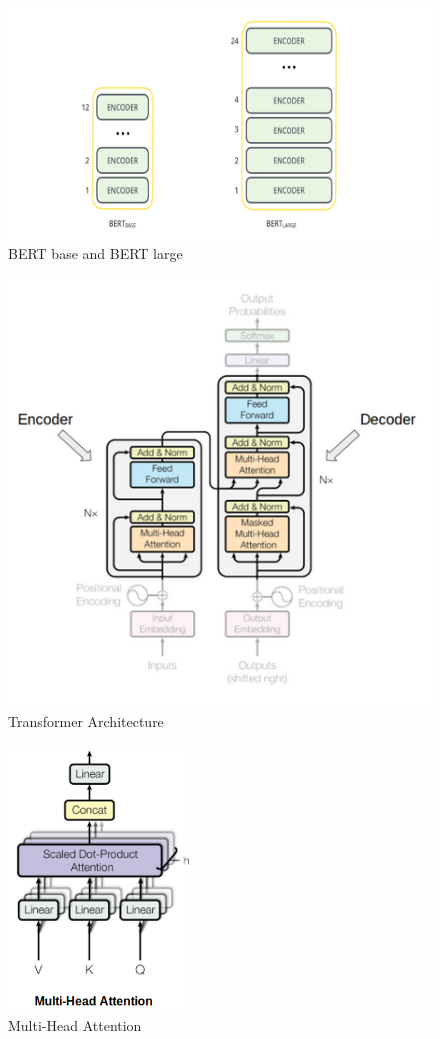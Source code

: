 \documentclass[11pt,a4paper]{article}
\begin{document}
\begin{figure}[!htb]
	\centering
	\includegraphics{figures/figure1.png}
	\caption{\label{fig:my-label} BERT base and BERT large \cite{BERT}}
\end{figure}

\begin{figure}[!htb]
	\centering
	\includegraphics{figures/figure2.png}
	\caption{\label{fig:my-label} Transformer Architecture \cite{attention}}
\end{figure}

\begin{figure}[!htb]
	\centering
	\includegraphics{figures/figure3.png}
	\caption{\label{fig:my-label} Multi-Head Attention \cite{attention}}
\end{figure}
\end{document}

